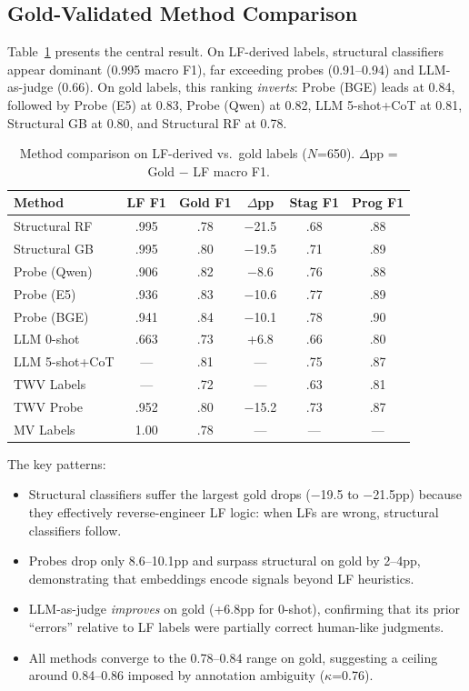 \documentclass[11pt,a4paper]{article}
\begin{document}
\subsection{Gold-Validated Method Comparison}
\label{sec:gold-comparison}

Table~\ref{tab:gold-main} presents the central result.
On LF-derived labels, structural classifiers appear dominant (0.995 macro F1), far exceeding probes (0.91--0.94) and LLM-as-judge (0.66).
On gold labels, this ranking \emph{inverts}: Probe (BGE) leads at 0.84, followed by Probe (E5) at 0.83, Probe (Qwen) at 0.82, LLM 5-shot+CoT at 0.81, Structural GB at 0.80, and Structural RF at 0.78.

\begin{table}[t]
\centering
\small
\caption{Method comparison on LF-derived vs.\ gold labels ($N$=650). $\Delta$pp = Gold $-$ LF macro F1.}
\label{tab:gold-main}
\begin{tabular}{lccccc}
\toprule
\textbf{Method} & \textbf{LF F1} & \textbf{Gold F1} & \textbf{$\Delta$pp} & \textbf{Stag F1} & \textbf{Prog F1} \\
\midrule
Structural RF  & .995 & .78 & $-$21.5 & .68 & .88 \\
Structural GB  & .995 & .80 & $-$19.5 & .71 & .89 \\
\midrule
Probe (Qwen)   & .906 & .82 & $-$8.6  & .76 & .88 \\
Probe (E5)     & .936 & .83 & $-$10.6 & .77 & .89 \\
Probe (BGE)    & .941 & .84 & $-$10.1 & .78 & .90 \\
\midrule
LLM 0-shot     & .663 & .73 & +6.8   & .66 & .80 \\
LLM 5-shot+CoT & ---  & .81 & ---    & .75 & .87 \\
\midrule
TWV Labels     & ---  & .72 & ---    & .63 & .81 \\
TWV Probe      & .952 & .80 & $-$15.2 & .73 & .87 \\
MV Labels      & 1.00 & .78 & ---    & ---  & --- \\
\bottomrule
\end{tabular}
\end{table}

The key patterns:
\begin{itemize}[nosep,leftmargin=*]
\item Structural classifiers suffer the largest gold drops ($-$19.5 to $-$21.5pp) because they effectively reverse-engineer LF logic: when LFs are wrong, structural classifiers follow.
\item Probes drop only 8.6--10.1pp and surpass structural on gold by 2--4pp, demonstrating that embeddings encode signals beyond LF heuristics.
\item LLM-as-judge \emph{improves} on gold (+6.8pp for 0-shot), confirming that its prior ``errors'' relative to LF labels were partially correct human-like judgments.
\item All methods converge to the 0.78--0.84 range on gold, suggesting a ceiling around 0.84--0.86 imposed by annotation ambiguity ($\kappa$=0.76).
\end{itemize}
\end{document}
